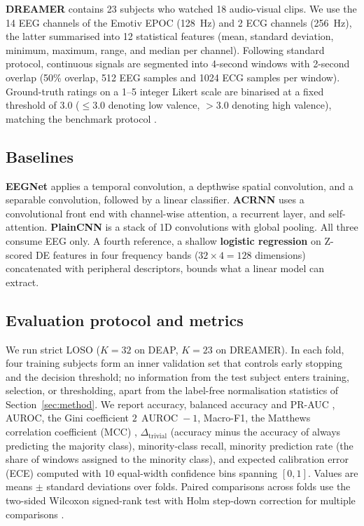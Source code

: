 \documentclass[a4paper,fleqn]{cas-sc}
\DeclareMathOperator{\AUROC}{AUROC}
\begin{document}
\noindent\textbf{DREAMER} \citep{katsigiannis2018dreamer} contains 23 subjects who watched 18 audio-visual clips. We use the 14 EEG channels of the Emotiv EPOC (128~Hz) and 2 ECG channels (256~Hz), the latter summarised into 12 statistical features (mean, standard deviation, minimum, maximum, range, and median per channel). Following standard protocol, continuous signals are segmented into 4-second windows with 2-second overlap (50\% overlap, 512 EEG samples and 1024 ECG samples per window). Ground-truth ratings on a 1--5 integer Likert scale are binarised at a fixed threshold of 3.0 ($\le 3.0$ denoting low valence, $> 3.0$ denoting high valence), matching the benchmark protocol \citep{katsigiannis2018dreamer}.

\subsection{Baselines}
\textbf{EEGNet} \citep{lawhern2018eegnet} applies a temporal convolution, a depthwise spatial convolution, and a separable convolution, followed by a linear classifier. \textbf{ACRNN} \citep{tao2020acrnn} uses a convolutional front end with channel-wise attention, a recurrent layer, and self-attention. \textbf{PlainCNN} is a stack of 1D convolutions with global pooling. All three consume EEG only. A fourth reference, a shallow \textbf{logistic regression} on Z-scored DE features in four frequency bands ($32\times4=128$ dimensions) concatenated with peripheral descriptors, bounds what a linear model can extract.

\subsection{Evaluation protocol and metrics}
We run strict LOSO ($K=32$ on DEAP, $K=23$ on DREAMER). In each fold, four training subjects form an inner validation set that controls early stopping and the decision threshold; no information from the test subject enters training, selection, or thresholding, apart from the label-free normalisation statistics of Section~\ref{sec:method}. We report accuracy, balanced accuracy and PR-AUC \citep{blagec2022metrics}, AUROC, the Gini coefficient $2\,\AUROC-1$, Macro-F1, the Matthews correlation coefficient (MCC) \citep{chicco2021mcc}, $\Delta_{\mathrm{trivial}}$ (accuracy minus the accuracy of always predicting the majority class), minority-class recall, minority prediction rate (the share of windows assigned to the minority class), and expected calibration error (ECE) \citep{minderer2021calibration} computed with 10 equal-width confidence bins spanning $[0, 1]$. Values are means $\pm$ standard deviations over folds. Paired comparisons across folds use the two-sided Wilcoxon signed-rank test with Holm step-down correction for multiple comparisons \citep{bouthillier2021variance}.
\end{document}
